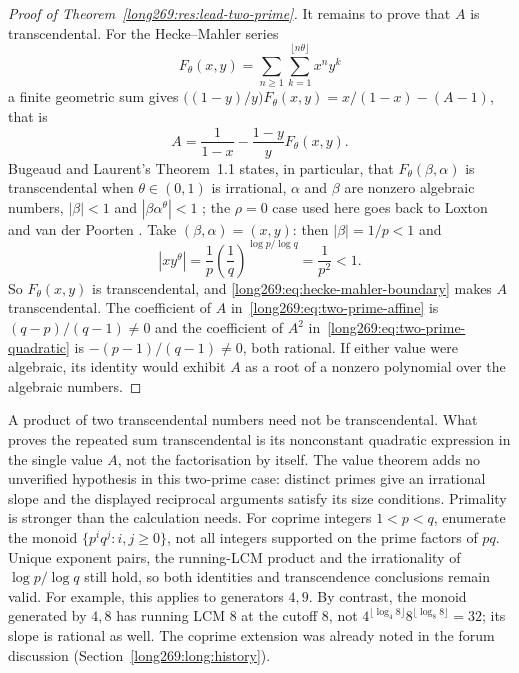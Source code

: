 \documentclass[11pt]{article}
\theoremstyle{remark}
\theoremstyle{plain}
\begin{document}
\begin{proof}[Proof of Theorem~\ref{long269:res:lead-two-prime}]
It remains to prove that $A$ is transcendental.  For the Hecke--Mahler series
\[
 F_\theta(x,y)=\sum_{n\ge1}\sum_{k=1}^{\lfloor n\theta\rfloor}x^ny^k
\]
a finite geometric sum gives
$\bigl((1-y)/y\bigr)F_\theta(x,y)=x/(1-x)-(A-1)$, that is
\begin{equation}\label{long269:eq:hecke-mahler-boundary}
 A=\frac1{1-x}-\frac{1-y}{y}F_\theta(x,y).
\end{equation}
Bugeaud and Laurent's Theorem~1.1 states, in particular, that
$F_\theta(\beta,\alpha)$ is transcendental when $\theta\in(0,1)$ is irrational,
$\alpha$ and $\beta$ are nonzero algebraic numbers, $|\beta|<1$ and
$|\beta\alpha^\theta|<1$ \cite[Theorem~1.1]{bugeaudlaurent2023}; the
$\rho=0$ case used here goes back to Loxton and van der Poorten
\cite[Theorem~8, p.~40]{loxtonvdp1977}.  Take $(\beta,\alpha)=(x,y)$: then
$|\beta|=1/p<1$ and
\[
 |xy^{\theta}|=\frac1p\left(\frac1q\right)^{\log p/\log q}=\frac1{p^{2}}<1 .
\]
So $F_\theta(x,y)$ is transcendental, and \eqref{long269:eq:hecke-mahler-boundary}
makes $A$ transcendental.  The coefficient of $A$
in~\eqref{long269:eq:two-prime-affine} is $(q-p)/(q-1)\ne0$ and the coefficient of
$A^{2}$ in~\eqref{long269:eq:two-prime-quadratic} is $-(p-1)/(q-1)\ne0$, both rational.
If either value were algebraic, its identity would exhibit $A$ as a root of a
nonzero polynomial over the algebraic numbers.
\end{proof}

\label{long269:res:two-prime-transcendence}\label{long269:res:two-prime-repeated-transcendence}
A product of two transcendental numbers need not be transcendental.
What proves the repeated sum transcendental is its nonconstant quadratic
expression in the single value $A$, not the factorisation by itself.
The value theorem adds no unverified hypothesis in this two-prime case:
distinct primes give an irrational slope and the displayed reciprocal
arguments satisfy its size conditions.  Primality is stronger than the
calculation needs.  For coprime integers $1<p<q$, enumerate the monoid
$\{p^iq^j:i,j\ge0\}$, not all integers supported on the prime factors of
$pq$.  Unique exponent pairs, the running-LCM product and the irrationality
of $\log p/\log q$ still hold, so both identities and transcendence
conclusions remain valid.  For example, this applies to generators $4,9$.
By contrast, the monoid generated by $4,8$ has running LCM $8$ at the
cutoff $8$, not $4^{\lfloor\log_4 8\rfloor}8^{\lfloor\log_8 8\rfloor}=32$;
its slope is rational as well.  The coprime extension was already noted
in the forum discussion (Section~\ref{long269:long:history}).
\end{document}

